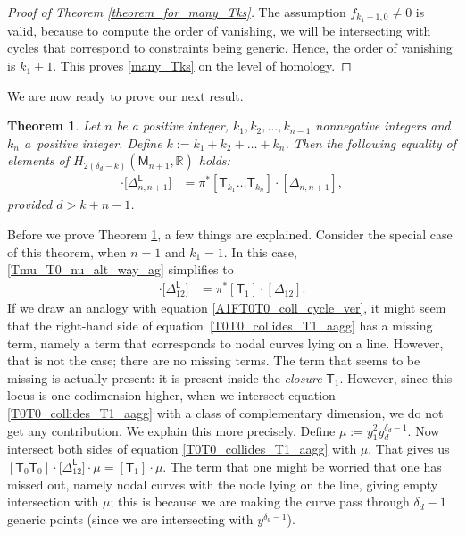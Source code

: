 \documentclass[pdftex]{sigma}
\numberwithin{equation}{section}
\newtheorem{thm}{Theorem}[section]
\begin{document}
\begin{proof}[Proof of Theorem \ref{theorem_for_many_Tks}]
The assumption $f_{k_1+1, 0} \neq 0$ is valid, because
to compute the order of vanishing, we will be intersecting with
cycles that correspond to constraints being generic. Hence, the order of vanishing is $k_1+1$.
This proves \eqref{many_Tks} on the level of homology.
\end{proof}

We are now ready to prove our next result.

\begin{thm}
\label{Tk1Tk2_etc_alt_way}
Let $n$ be a positive integer, $k_1, k_2,\dots, k_{n-1}$ nonnegative integers
and $k_n$ a~positive integer.
Define
$
k :=  k_1+k_2+\dots +k_n$.
Then the following equality of elements of $H_{2(\delta_d-k)}(\mathsf{M}_{n+1}, {\mathbb R})$ holds:
\begin{align}
[\mathsf{T}_{k_1} \dots \mathsf{T}_{k_{n-1}} \mathsf{T}_{k_n-1} \mathsf{T}_0] \cdot \bigl[\Delta_{n, {n+1}}^{\mathsf{L}}\bigr] & =
\pi^*[\mathsf{T}_{k_1} \dots \mathsf{T}_{k_n}] \cdot [\Delta_{n, n+1}],
\label{Tmu_T0_nu_alt_way_ag}
\end{align}
provided $d > k+n-1$.
\end{thm}

Before we prove Theorem \ref{Tk1Tk2_etc_alt_way}, a few things are explained.
Consider the special case of this theorem, when $n = 1$ and $k_1 = 1$.
In this case, \eqref{Tmu_T0_nu_alt_way_ag} simplifies to
\begin{align}
[\mathsf{T}_0 \mathsf{T}_0] \cdot \bigl[\Delta^{\mathsf{L}}_{12}\bigr] &  =  \pi^*[\mathsf{T}_1]\cdot [\Delta_{12}].
\label{T0T0_collides_T1_aagg}
\end{align}
If we draw an analogy with equation \eqref{A1FT0T0_coll_cycle_ver},
it might seem that the right-hand side
of equation~\eqref{T0T0_collides_T1_aagg}
has a missing term, namely
a term that corresponds to nodal curves lying
on a line. However, that is not the case; there are no missing terms.
The term that seems to be missing is actually present: it is present
inside the \emph{closure} $\overline{\mathsf{T}}_1$. However, since this locus
is one codimension higher, when we intersect
equation \eqref{T0T0_collides_T1_aagg} with a class of complementary dimension, we do not get
any contribution. We explain this more precisely. Define
$\mu := y_1^{2} y_d^{\delta_d-1}$. Now intersect both sides of
equation \eqref{T0T0_collides_T1_aagg} with $\mu$. That gives us
$[\mathsf{T}_0 \mathsf{T}_0] \cdot \bigl[\Delta^{\mathsf{L}}_{12}\bigr]\cdot \mu  =
[\mathsf{T}_1]\cdot \mu$.
The term that one might be worried that one has missed out, namely nodal curves
with the node lying on the line, giving empty intersection with $\mu$; this is
because we are making the curve pass through $\delta_d-1$ generic points \big(since we
are intersecting with $y^{\delta_d-1}$\big).
\end{document}
